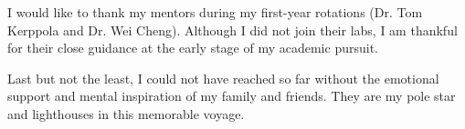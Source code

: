 I would like to thank my mentors during my first-year rotations (Dr. Tom Kerppola and Dr. Wei Cheng). Although I did not join their labs, I am thankful for their close guidance at the early stage of my academic pursuit.%

Last but not the least, I could not have reached so far without the emotional support and mental inspiration of my family and friends. They are my pole star and lighthouses in this memorable voyage.
